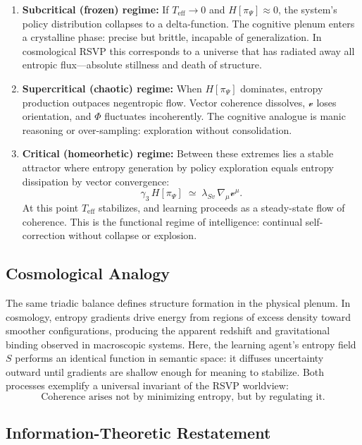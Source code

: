 \documentclass[11pt]{article}
\begin{document}
\begin{enumerate}
\item \textbf{Subcritical (frozen) regime:}  
If $T_{\mathrm{eff}}\!\rightarrow\!0$ and $H[\pi_\Psi]\!\approx\!0$, the system’s policy distribution collapses to a delta-function.  
The cognitive plenum enters a crystalline phase: precise but brittle, incapable of generalization.  
In cosmological RSVP this corresponds to a universe that has radiated away all entropic flux—absolute stillness and death of structure.

\item \textbf{Supercritical (chaotic) regime:}  
When $H[\pi_\Psi]$ dominates, entropy production outpaces negentropic flow.  
Vector coherence dissolves, $\mathcal{v}$ loses orientation, and $\Phi$ fluctuates incoherently.  
The cognitive analogue is manic reasoning or over-sampling: exploration without consolidation.

\item \textbf{Critical (homeorhetic) regime:}  
Between these extremes lies a stable attractor where entropy generation by policy exploration equals entropy dissipation by vector convergence:
\[
\gamma_3\,H[\pi_\Psi] \;\simeq\; \lambda_{Sv}\,\nabla_\mu \mathcal{v}^\mu.
\]
At this point $T_{\mathrm{eff}}$ stabilizes, and learning proceeds as a steady-state flow of coherence.  
This is the functional regime of intelligence: continual self-correction without collapse or explosion.
\end{enumerate}

\subsection{Cosmological Analogy}

The same triadic balance defines structure formation in the physical plenum.  
In cosmology, entropy gradients drive energy from regions of excess density toward smoother configurations, producing the apparent redshift and gravitational binding observed in macroscopic systems.  
Here, the learning agent’s entropy field $S$ performs an identical function in semantic space: it diffuses uncertainty outward until gradients are shallow enough for meaning to stabilize.  
Both processes exemplify a universal invariant of the RSVP worldview:
\[
\text{Coherence arises not by minimizing entropy, but by regulating it.}
\]

\subsection{Information-Theoretic Restatement}
\end{document}
